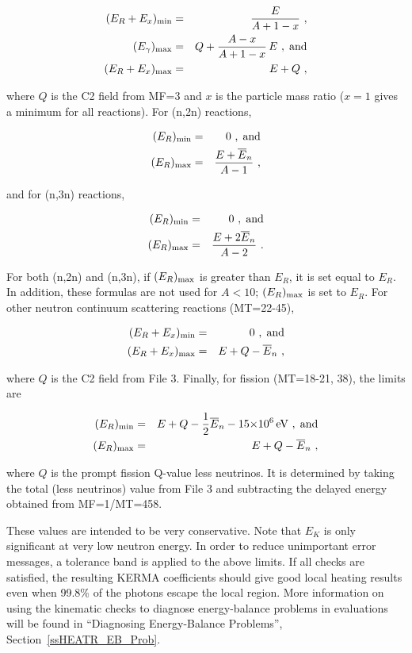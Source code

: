 \begin{eqnarray}
   (E_R+E_x)_{\rm min}&=&\frac{E}{A+1-x}\,\,,\\
   (E_\gamma)_{\rm max}&=&Q+\frac{A-x}{A+1-x}\,E\,\,,\;\hbox{and}\\
   (E_R+E_x)_{\rm max}&=&E+Q\,\,,
\end{eqnarray}

\noindent
where $Q$ is the C2 field from MF=3 and $x$ is the particle mass
ratio ($x{=}1$ gives a minimum for all reactions).
For (n,2n) reactions,

\begin{eqnarray}
   (E_R)_{\rm min}&=&0\,\,,\;\hbox{and}\\
   (E_R)_{\rm max}&=&\frac{E+\overline{E}_n}{A-1}\,\,,
\end{eqnarray}

\noindent
and for (n,3n) reactions,

\begin{eqnarray}
   (E_R)_{\rm min}&=&0\,\,,\;\hbox{and}\\
   (E_R)_{\rm max}&=&\frac{E+2\overline{E}_n}{A-2}\,\,.
\end{eqnarray}

\noindent
For both (n,2n) and (n,3n), if $(E_R)_{\rm max}$ is greater than
$E_R$, it is set equal to $E_R$.  In addition, these formulas
are not used for $A{<}10$; $(E_R)_{\rm max}$ is set to $E_R$.
For other neutron continuum scattering reactions (MT=22-45),

\begin{eqnarray}
   (E_R+E_x)_{\rm min}&=&0\,\,,\;\hbox{and}\\
   (E_R+E_x)_{\rm max}&=&E+Q-\overline{E}_n\,\,,
\end{eqnarray}

\noindent
where $Q$ is the C2 field from File 3.  Finally, for fission
(MT=18-21, 38), the limits are

\begin{eqnarray}
   (E_R)_{\rm min}&=&E+Q-\frac{1}{2}
    \overline{E}_n-15{\times}10^6\,\hbox{\rm eV}\,\,,\;\hbox{and}\\
   (E_R)_{\rm max}&=&E+Q-\overline{E}_n\,\,,
\end{eqnarray}

\noindent
where $Q$ is the prompt fission Q-value less neutrinos.  It
is determined by taking the total (less neutrinos) value from
File 3 and subtracting the delayed energy obtained from
MF=1/MT=458.

These values are intended to be very conservative.  Note
that $E_K$ is only significant at very low neutron energy.
In order to reduce unimportant error messages, a tolerance
band is applied to the above limits.  If all checks are
satisfied, the resulting KERMA coefficients should give good
local heating results even when 99.8\% of the photons
escape the local region.  More information on using the
kinematic checks to diagnose energy-balance problems in
evaluations will be found in ``Diagnosing Energy-Balance
Problems'', Section~\ref{ssHEATR_EB_Prob}.

